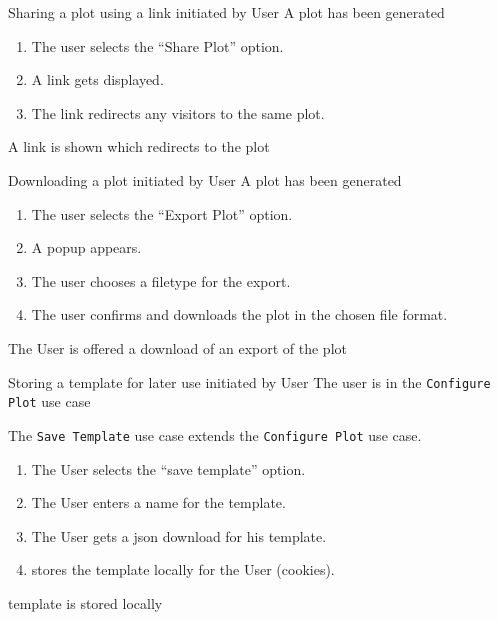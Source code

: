 \bigskip

{Sharing a \gls{plot} using a link}
{initiated by User}
{A \gls{plot} has been generated}
{\begin{enumerate}
    \item The user selects the \enquote{Share Plot} option.
    \item A link gets displayed.
    \item The link redirects any visitors to the same \gls{plot}.
\end{enumerate}}
{A link is shown which redirects to the \gls{plot}}

\bigskip

{Downloading a plot}
{initiated by User}
{A \gls{plot} has been generated}
{\begin{enumerate}
    \item The user selects the \enquote{Export Plot} option.
    \item A popup appears.
    \item The user chooses a filetype for the export.
    \item The user confirms and downloads the \gls{plot} in the chosen file format.
\end{enumerate}}
{The User is offered a download of an export of the \gls{plot}}

\bigskip

{Storing a \gls{template} for later use}
{initiated by User}
{The user is in the \texttt{Configure Plot} use case}
{The \texttt{Save Template} use case extends the \texttt{Configure Plot} use case.
\begin{enumerate}
    \item The User selects the \enquote{save template} option.
    \item The User enters a name for the \gls{template}.
    \item The User gets a \gls{json} download for his \gls{template}.
    \item \parkview{} stores the template locally for the User (cookies).
\end{enumerate}}
{\Gls{template} is stored locally}

\bigskip

